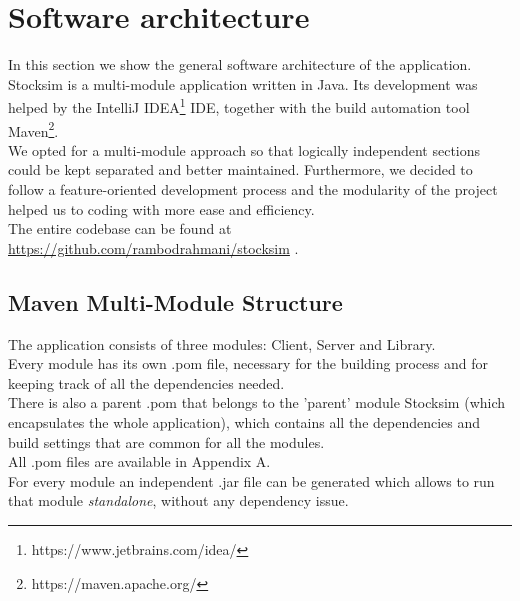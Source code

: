 \chapter{Software architecture}

In this section we show the general software architecture of the application.\\
Stocksim is a multi-module application written in Java. Its development was helped by the IntelliJ IDEA\footnote{https://www.jetbrains.com/idea/} IDE, together with the build automation tool Maven\footnote{https://maven.apache.org/}.\\
We opted for a multi-module approach so that logically independent sections could be kept separated and better maintained. Furthermore, we decided to follow a feature-oriented development process and the modularity of the project helped us to coding with more ease and efficiency.\\
The entire codebase can be found at \url{https://github.com/rambodrahmani/stocksim} .

\section{Maven Multi-Module Structure}

The application consists of three modules: Client, Server and Library.\\
Every module has its own .pom file, necessary for the building process and for keeping track of all the dependencies needed.\\
There is also a parent .pom that belongs to the 'parent' module Stocksim (which encapsulates the whole application), which contains all the dependencies and build settings that are common for all the modules.\\
All .pom files are available in Appendix A.\\
For every module an independent .jar file can be generated  which allows to run that module \textit{standalone}, without any dependency issue.

